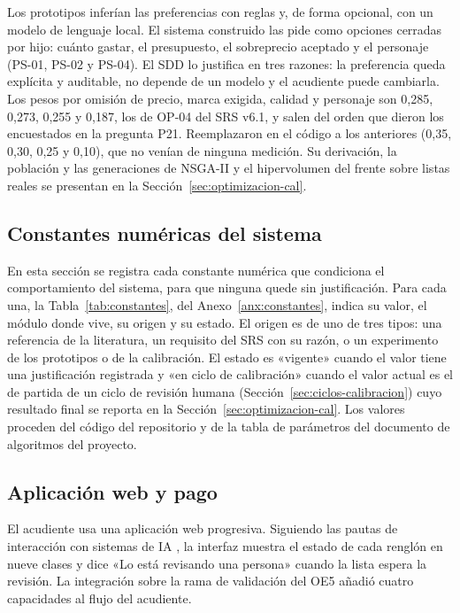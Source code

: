 Los prototipos inferían las
preferencias con reglas y, de forma opcional, con un modelo de lenguaje local. El sistema construido
las pide como opciones cerradas por hijo: cuánto gastar, el presupuesto, el sobreprecio aceptado y
el personaje (PS-01, PS-02 y PS-04). El SDD lo justifica en tres razones: la preferencia queda
explícita y auditable, no depende de un modelo y el acudiente puede cambiarla. Los pesos por omisión
de precio, marca exigida, calidad y personaje son 0,285, 0,273, 0,255 y 0,187, los de OP-04 del SRS
v6.1, y salen del orden que dieron los encuestados en la pregunta P21. Reemplazaron en el código a
los anteriores (0,35, 0,30, 0,25 y 0,10), que no venían de ninguna medición. Su derivación, la
población y las generaciones de NSGA-II y el hipervolumen del frente sobre listas reales se presentan
en la Sección~\ref{sec:optimizacion-cal}.

\subsection{Constantes numéricas del sistema}
\label{sec:constantes}

En esta sección se registra cada constante numérica que condiciona el comportamiento del sistema,
para que ninguna quede sin justificación. Para cada una, la Tabla~\ref{tab:constantes}, del Anexo~\ref{anx:constantes}, indica su
valor, el módulo donde vive, su origen y su estado. El origen es de uno de tres tipos: una
referencia de la literatura, un requisito del SRS con su razón, o un experimento de los
prototipos o de la calibración. El estado es «vigente» cuando el valor tiene una justificación
registrada y «en ciclo de calibración» cuando el valor actual es el de partida de un ciclo de
revisión humana (Sección~\ref{sec:ciclos-calibracion}) cuyo resultado final se reporta en la
Sección~\ref{sec:optimizacion-cal}. Los valores proceden del código del repositorio y de la tabla de
parámetros del documento de algoritmos del proyecto.

\subsection{Aplicación web y pago}
\label{sec:web}

El acudiente usa una aplicación web progresiva. Siguiendo las pautas de interacción con sistemas de
IA \citep{amershi_guidelines_2019}, la interfaz muestra el estado de cada renglón en nueve clases y
dice «Lo está revisando una persona» cuando la lista espera la revisión. La integración sobre la
rama de validación del OE5 añadió cuatro capacidades al flujo del acudiente.

